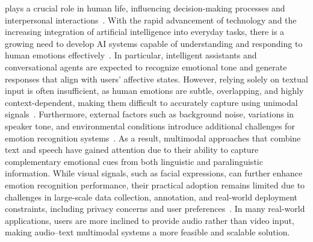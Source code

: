  plays a crucial role in human life, influencing decision-making processes and interpersonal interactions~\cite{COWIE20035}. With the rapid advancement of technology and the increasing integration of artificial intelligence into everyday tasks, there is a growing need to develop AI systems capable of understanding and responding to human emotions effectively~\cite{Venkataramanan2019}. In particular, intelligent assistants and conversational agents are expected to recognize emotional tone and generate responses that align with users’ affective states. However, relying solely on textual input is often insufficient, as human emotions are subtle, overlapping, and highly context-dependent, making them difficult to accurately capture using unimodal signals~\cite{PAYALA2026}. Furthermore, external factors such as background noise, variations in speaker tone, and environmental conditions introduce additional challenges for emotion recognition systems~\cite{PAYALA2026}. As a result, multimodal approaches that combine text and speech have gained attention due to their ability to capture complementary emotional cues from both linguistic and paralinguistic information. While visual signals, such as facial expressions, can further enhance emotion recognition performance, their practical adoption remains limited due to challenges in large-scale data collection, annotation, and real-world deployment constraints, including privacy concerns and user preferences~\cite{Lian2023}. In many real-world applications, users are more inclined to provide audio rather than video input, making audio–text multimodal systems a more feasible and scalable solution.

